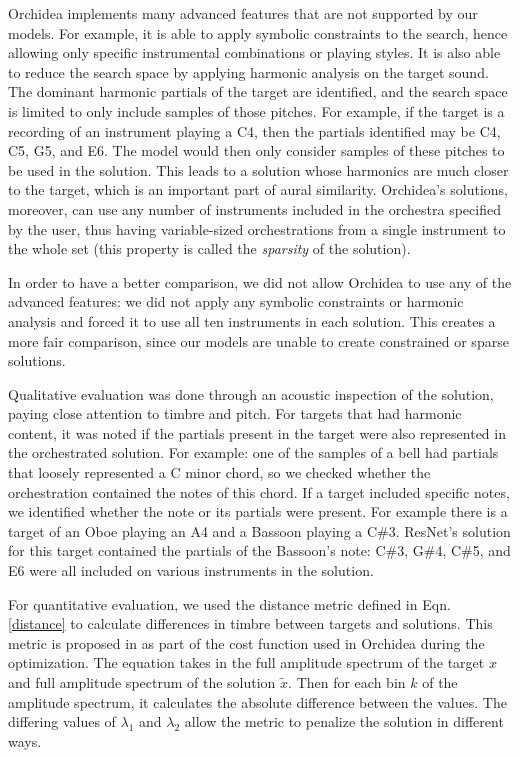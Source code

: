 \documentclass[runningheads,a4paper]{llncs}
\begin{document}
Orchidea implements many advanced features that are not supported by our models. For example, it is able to apply symbolic constraints to the search, hence allowing only specific instrumental combinations or playing styles. It is also able to reduce the search space by applying harmonic analysis on the target sound. The dominant harmonic partials of the target are identified, and the search space is limited to only include samples of those pitches. For example, if the target is a recording of an instrument playing a C4, then the partials identified may be C4, C5, G5, and E6. The model would then only consider samples of these pitches to be used in the solution. This leads to a solution whose harmonics are much closer to the target, which is an important part of aural similarity. Orchidea's solutions, moreover, can use any number of instruments included in the orchestra specified by the user, thus having variable-sized orchestrations from a single instrument to the whole set (this property is called the \emph{sparsity} of the solution).

In order to have a better comparison, we did not allow Orchidea to use any of the advanced features: we did not apply any symbolic constraints or harmonic analysis and forced it to use all ten instruments in each solution. This creates a more fair comparison, since our models are unable to create constrained or sparse solutions.

Qualitative evaluation was done through an acoustic inspection of the solution, paying close attention to timbre and pitch. For targets that had harmonic content, it was noted if the partials present in the target were also represented in the orchestrated solution. For example: one of the samples of a bell had partials that loosely represented a C minor chord, so we checked whether the orchestration contained the notes of this chord. If a target included specific notes, we identified whether the note or its partials were present. For example there is a target of an Oboe playing an A4 and a Bassoon playing a C\#3. ResNet's solution for this target contained the partials of the Bassoon's note: C\#3, G\#4, C\#5, and E6 were all included on various instruments in the solution.

For quantitative evaluation, we used the distance metric defined in Eqn. \ref{distance} to calculate differences in timbre between targets and solutions. This metric is proposed in \cite{Cella2020} as part of the cost function used in Orchidea during the optimization. The equation takes in the full amplitude spectrum of the target $x$ and full amplitude spectrum of the solution $\tilde{x}$. Then for each bin $k$ of the amplitude spectrum, it calculates the absolute difference between the values. The differing values of $\lambda_1$ and $\lambda_2$ allow the metric to penalize the solution in different ways.
\end{document}
